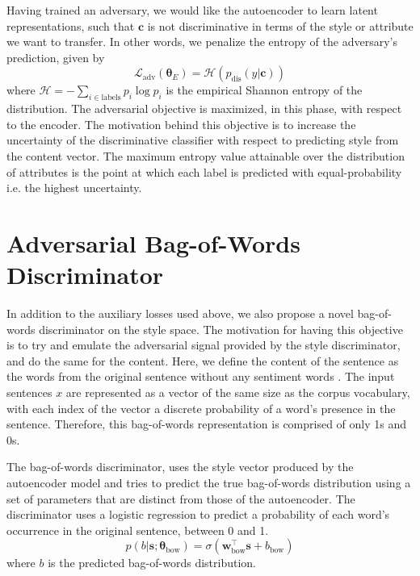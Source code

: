 Having trained an adversary, we would like the autoencoder to learn latent representations, such that $\bm c$ is not discriminative in terms of the style or attribute we want to transfer. In other words, we penalize the entropy of the adversary's prediction, given by
\begin{equation}
	\mathcal{L}_\text{adv}(\bm\theta_E) = \mathcal{H}(p_\text{dis}(y | \bm c))
\end{equation}
where $\mathcal{H}=-\sum_{i\in\text{labels}} p_i\log p_i$ is the empirical Shannon entropy of the distribution. The adversarial objective is maximized, in this phase, with respect to the encoder. The motivation behind this objective is to increase the uncertainty of the discriminative classifier with respect to predicting style from the content vector. The maximum entropy value attainable over the distribution of attributes is the point at which each label is predicted with equal-probability i.e. the highest uncertainty.


\section{Adversarial Bag-of-Words Discriminator} \label{ssec:adversarial-bow-objective}

In addition to the auxiliary losses used above, we also propose a novel bag-of-words discriminator on the style space. The motivation for having this objective is to try and emulate the adversarial signal provided by the style discriminator, and do the same for the content. Here, we define the content of the sentence as the words from the original sentence without any sentiment words \citep{hu2004mining}. The input sentences $x$ are represented as a vector of the same size as the corpus vocabulary, with each index of the vector a discrete probability of a word's presence in the sentence. Therefore, this bag-of-words representation is comprised of only 1s and 0s.

The bag-of-words discriminator, uses the style vector produced by the autoencoder model and tries to predict the true bag-of-words distribution using a set of parameters that are distinct from those of the autoencoder. The discriminator uses a logistic regression to predict a probability of each word's occurrence in the original sentence, between 0 and 1.
\begin{equation}
	p(b | \bm s; \bm\theta_\text{bow}) = \sigma(\bm w_\text{bow}^\top \bm s + b_\text{bow})
\end{equation}
where $b$ is the predicted bag-of-words distribution.

